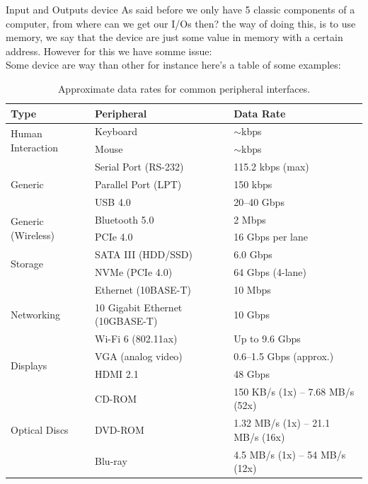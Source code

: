 \begin{parag}{Input and Outputs device}
    As said before we only have 5 classic components of a computer, from where can we get our I/Os then? the way of doing this, is to use memory, we say that the device are just some value in memory with a certain address. However for this we have somme issue:\\
	Some device are way  than other for instance here's a table of some examples:
\end{parag}
	\begin{table}[h!]
\centering
\begin{tabular}{|l|l|l|}
\hline
\textbf{Type} & \textbf{Peripheral} & \textbf{Data Rate} \\ \hline
\multirow{2}{*}{Human Interaction} & Keyboard & $\sim$kbps \\
 & Mouse & $\sim$kbps \\ \hline
\multirow{3}{*}{Generic} & Serial Port (RS-232) & 115.2 kbps (max) \\
 & Parallel Port (LPT) & 150 kbps \\
 & USB 4.0 & 20--40 Gbps \\ \hline
\multirow{2}{*}{Generic (Wireless)} & Bluetooth 5.0 & 2 Mbps \\
 & PCIe 4.0 & 16 Gbps per lane \\ \hline
\multirow{2}{*}{Storage} & SATA III (HDD/SSD) & 6.0 Gbps \\
 & NVMe (PCIe 4.0) & 64 Gbps (4-lane) \\ \hline
\multirow{3}{*}{Networking} & Ethernet (10BASE-T) & 10 Mbps \\
 & 10 Gigabit Ethernet (10GBASE-T) & 10 Gbps \\
 & Wi-Fi 6 (802.11ax) & Up to 9.6 Gbps \\ \hline
\multirow{2}{*}{Displays} & VGA (analog video) & 0.6--1.5 Gbps (approx.) \\
 & HDMI 2.1 & 48 Gbps \\ \hline
\multirow{3}{*}{Optical Discs} & CD-ROM & 150 KB/s (1x) -- 7.68 MB/s (52x) \\
 & DVD-ROM & 1.32 MB/s (1x) -- 21.1 MB/s (16x) \\
 & Blu-ray & 4.5 MB/s (1x) -- 54 MB/s (12x) \\ \hline
\end{tabular}
\caption{Approximate data rates for common peripheral interfaces.}
\end{table}
